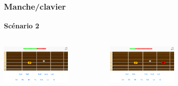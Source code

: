 \documentclass{beamer}
\begin{document}
	\begin{frame}

   		\frametitle{Manche/clavier}

       		\framesubtitle{Scénario 2}

		\begin{columns}

			 \begin{column}{0.33\textwidth}

				\includegraphics[width=3.5cm]{images/clavier_question.png}

			\end{column}

			 \begin{column}{0.33\textwidth}

				\includegraphics[width=3.5cm]{images/clavier_mauvaise.png}

				
			\end{column}

			 \begin{column}{0.33\textwidth}

				
			\end{column}

		\end{columns} 

	\end{frame}
\end{document}
